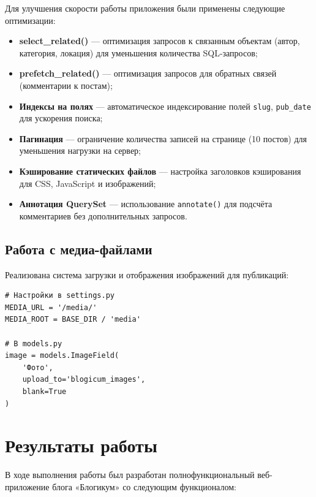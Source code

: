 \documentclass[pract,och,bachelor]{SCWorks}
\begin{document}
Для улучшения скорости работы приложения были применены следующие оптимизации:
\begin{itemize}
    \item \textbf{select\_related()} --- оптимизация запросов к связанным объектам (автор, категория, локация) для уменьшения количества SQL-запросов;
    \item \textbf{prefetch\_related()} --- оптимизация запросов для обратных связей (комментарии к постам);
    \item \textbf{Индексы на полях} --- автоматическое индексирование полей \texttt{slug}, \texttt{pub\_date} для ускорения поиска;
    \item \textbf{Пагинация} --- ограничение количества записей на странице (10 постов) для уменьшения нагрузки на сервер;
    \item \textbf{Кэширование статических файлов} --- настройка заголовков кэширования для CSS, JavaScript и изображений;
    \item \textbf{Аннотация QuerySet} --- использование \texttt{annotate()} для подсчёта комментариев без дополнительных запросов.
\end{itemize}

\subsection{Работа с медиа-файлами}

Реализована система загрузки и отображения изображений для публикаций:

\begin{listing}[H]
\begin{verbatim}
# Настройки в settings.py
MEDIA_URL = '/media/'
MEDIA_ROOT = BASE_DIR / 'media'

# В models.py
image = models.ImageField(
    'Фото', 
    upload_to='blogicum_images', 
    blank=True
)
\end{verbatim}
\caption{Настройка работы с медиа-файлами}
\end{listing}

\section{Результаты работы}

В ходе выполнения работы был разработан полнофункциональный веб-приложение блога «Блогикум» со следующим функционалом:
\end{document}
